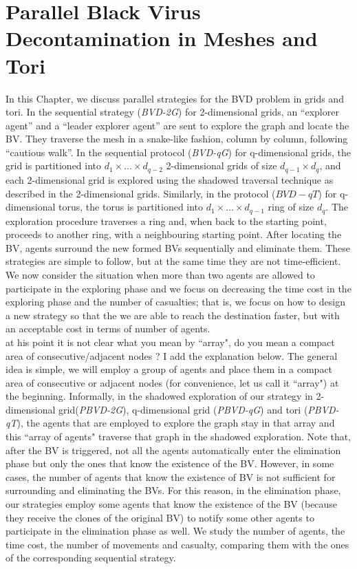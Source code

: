 \chapter {Parallel Black Virus Decontamination in Meshes and Tori}
\label{DL}

In this Chapter, we discuss parallel strategies for the BVD problem in grids and tori. In the sequential strategy ({\em BVD-2G}) for 2-dimensional grids, an ``explorer agent'' and a ``leader explorer agent'' are sent to explore the graph and locate the BV. They traverse the mesh in a snake-like fashion, column by column, following   ``cautious walk''. In the sequential protocol ({\em BVD-qG}) for q-dimensional grids, the grid is partitioned into $d_1\times\ldots\times d_{q-2}$ 2-dimensional grids of size $d_{q-1}\times d_q$, and each 2-dimensional grid is explored using the shadowed traversal technique as described in the 2-dimensional grids. Similarly, in the protocol ($BVD-qT$) for q-dimensional torus, the torus is partitioned into $d_1\times \ldots \times d_{q-1}$ ring of size $d_q$. The exploration procedure traverses a ring and, when back to the starting point, proceeds to another ring, with a neighbouring starting point. After locating the BV, agents surround the new formed BVs sequentially and eliminate them. These strategies are simple to follow, but at the same time they are not time-efficient. We now consider the situation when  more than two agents are allowed to participate in the exploring phase and we focus on decreasing the time cost in the exploring phase and the number of casualties; that is, we focus on how to design a new strategy so that the we are able to reach the destination faster, but with  an acceptable cost in terms of number of agents.\\
\color{blue} at his point it is not clear what you mean by ``array", do you mean a compact area of consecutive/adjacent nodes ? I add the explanation below.
\color{black}
The general idea is simple, we will employ a group of agents and place them in a compact area of consecutive or adjacent nodes (for convenience, let us call it ``array") at the beginning.  Informally, in the shadowed exploration of our strategy in 2-dimensional grid({\em PBVD-2G}), q-dimensional grid ({\em PBVD-qG}) and tori ({\em PBVD-qT}), the agents that are employed to explore the graph stay in that array and this  ``array of agents"  traverse that graph in the shadowed exploration. 
Note that, after the BV is triggered, not all the agents automatically enter the elimination phase but only the ones that   know the existence of the  BV. However,  in some cases, the number of agents that know the existence of BV is not sufficient for surrounding and eliminating the BVs. For this reason,  in the elimination phase, our strategies employ some agents that know  the existence of the BV (because they receive the clones of the original BV) to notify some other agents to participate in the elimination phase as well. 
We study the number of agents, the time cost, the number of movements and  casualty, comparing them with  the ones of the corresponding sequential strategy.

